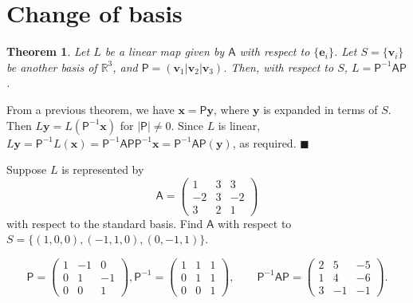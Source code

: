 \documentclass[letter-paper]{tufte-book}
\newtheorem{theorem}{\color{pastel-blue}Theorem}[section]
\newenvironment{proof}[1][Proof]{\begin{trivlist}
\item[\hskip \labelsep {\bfseries #1}]}{\end{trivlist}}
\newenvironment{example}[1][Example]{\begin{trivlist}
\item[\hskip \labelsep {\bfseries #1}]}{\end{trivlist}}
\newcommand{\eb}{\boldsymbol{e}}
\newcommand{\vb}{\boldsymbol{v}}
\newcommand{\xb}{\boldsymbol{x}}
\newcommand{\yb}{\boldsymbol{y}}
\newcommand{\qed}{\hfill$\blacksquare$}
\begin{document}
\section{Change of basis}

\begin{theorem}
	Let $L$ be a linear map given by $\mathsf{A}$ with respect to $\{\eb_i\}$.
	Let $S=\{\vb_i\}$ be another basis of $\mathbb{R}^3$, and $\mathsf{P}=(\vb_1
	|\vb_2| \vb_3)$. Then, with respect to $S$,
	$L=\mathsf{P}^{-1}\mathsf{A}\mathsf{P}$.
\end{theorem}
\begin{proof}
	From a previous theorem, we have $\xb=\mathsf{P}\yb$, where $\yb$ is
	expanded in terms of $S$. Then $L\yb=L(\mathsf{P}^{-1}\xb)$ for
	$|\mathsf{P}|\neq0$. Since $L$ is linear,
	$L\yb=\mathsf{P}^{-1}L(\xb)=\mathsf{P}^{-1}\mathsf{A}\mathsf{P}
	\mathsf{P}^{-1}\xb=\mathsf{P}^{-1}\mathsf{A}\mathsf{P}(\yb)$,
	as required. \qed
\end{proof}

\begin{example}
	Suppose $L$ is represented by
	\begin{equation*}
		\mathsf{A}=\begin{pmatrix}1&3&3\\-2&3&-2\\3&2&1\end{pmatrix}
	\end{equation*}
	with respect to the standard basis. Find $\mathsf{A}$ with respect to
	$S=\{(1,0,0),(-1,1,0),(0,-1,1)\}$.
	
	\begin{equation*}
		\mathsf{P}=\begin{pmatrix}1&-1&0\\0&1&-1\\0&0&1\end{pmatrix},
		\mathsf{P}^{-1}=\begin{pmatrix}1&1&1\\0&1&1\\0&0&1\end{pmatrix},\qquad
		\mathsf{P}^{-1}\mathsf{A}\mathsf{P}=
		\begin{pmatrix}2&5&-5\\1&4&-6\\3&-1&-1\end{pmatrix}.
	\end{equation*}
\end{example}
\end{document}
